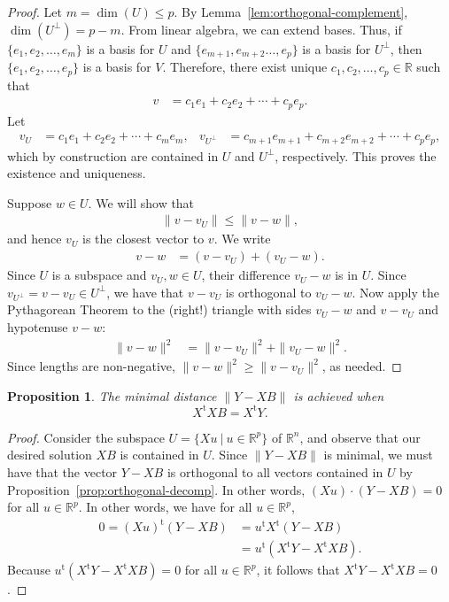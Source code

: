 \documentclass[a4paper, 12pt]{article}
\numberwithin{equation}{section}
\numberwithin{figure}{section}
\newtheorem{prop}[thm]{Proposition}
\theoremstyle{definition}
\renewcommand{\leq}{\leqslant}
\renewcommand{\geq}{\geqslant}
\newcommand{\R}{\mathbb{R}}
\newcommand{\tr}{\mathrm{t}}
\begin{document}
\begin{proof}
	Let $m=\dim(U)\leq p$. By Lemma~\ref{lem:orthogonal-complement},
	$\dim(U^{\perp})=p-m$. From linear algebra, we can extend bases. Thus, if
	$\{e_1, e_2, \dots, e_m\}$ is a basis for $U$ and $\{e_{m+1},e_{m+2}\dots,
	e_{p}\}$ is a basis for $U^{\perp}$, then $\{e_1,e_2,\dots, e_p\}$ is a
	basis for $V$. Therefore, there exist unique $c_1,c_2,\dots, c_p\in \R$ such
	that 
	\begin{align*}
		v &= c_1e_1 + c_2e_2 + \cdots + c_pe_p.
	\end{align*}
	Let 
	\begin{align*}
		v_{U} &= c_1e_1 + c_2e_2 + \cdots + c_me_m, & v_{U^{\perp}} &= c_{m+1}e_{m+1} + c_{m+2}e_{m+2} + \cdots + c_pe_p,
	\end{align*}
	which by construction are contained in $U$ and $U^{\perp}$, respectively.
	This proves the existence and uniqueness. 

	Suppose $w\in U$. We will show that 
	\begin{align*}
		\| v - v_U \| \leq \| v - w \|,
	\end{align*}
	and hence $v_U$ is the closest vector to $v$. We write
	\begin{align*}
		v - w &= (v - v_U) + (v_U - w).
	\end{align*}
	Since $U$ is a subspace and $v_U,w\in U$, their difference $v_U-w$ is in
	$U$. Since $v_{U^{\perp}} = v - v_U\in U^{\perp}$, we have that $v-v_U$ is
	orthogonal to $v_U-w$. Now apply the Pythagorean Theorem to the (right!)
	triangle with sides $v_U-w$ and $v-v_U$ and hypotenuse $v-w$: 
	\begin{align*}
		\|v - w\|^2 &= \|v - v_U\|^2 + \|v_U - w\|^2.
	\end{align*}
	Since lengths are non-negative, $\|v - w\|^2 \geq \|v - v_U\|^2$, as needed.
\end{proof}



\begin{prop}
	The minimal distance $\| Y - XB \|$ is achieved when
	\[ 
		X^{\tr} X B = X^{\tr} Y.
	\] 
\end{prop}

\begin{proof} 
	Consider the subspace $U = \{Xu ~|~ u\in\R^p\}$ of $\R^n$, and observe that
	our desired solution $XB$ is contained in $U$. Since $\| Y - XB \|$ is
	minimal, we must have that the vector $Y - XB$ is orthogonal to all vectors
	contained in $U$ by Proposition~\ref{prop:orthogonal-decomp}. In other
	words, $(Xu) \cdot (Y - XB) = 0$ for all $u\in\R^p$. In other words, we have
	for all $u\in \R^p$,
	\begin{align*} 
		0 = (Xu)^{\tr} (Y - XB) &= u^{\tr} X^{\tr}(Y - XB) \\
		&= u^{\tr} \left(X^{\tr}Y - X^{\tr}XB\right).
	\end{align*}
	Because $u^{\tr} \left(X^{\tr}Y - X^{\tr}XB\right)=0$ for all $u\in \R^p$,
	it follows that $X^{\tr}Y - X^{\tr}XB=0$. 
\end{proof}
\end{document}
